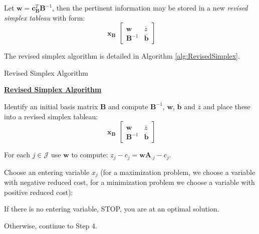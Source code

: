 Let $\mathbf{w} = \mathbf{c}_\mathbf{B}^{T}\mathbf{B}^{-1}$, then the pertinent information may be stored in a new \textit{revised simplex tableau} with form:
\begin{equation}
\begin{array}{c}
\\
\mathbf{x}_\mathbf{B}
\end{array}
\left[
\begin{array}{c|c}
\mathbf{w} & \overline{z}\\
\hline
\mathbf{B}^{-1} & \overline{\mathbf{b}}
\end{array}\right]
\end{equation}

The revised simplex algorithm is detailed in Algorithm \ref{alg:RevisedSimplex}. 
\begin{algorithm}
\caption{Revised Simplex Algorithm}
\label{alg:RevisedSimplex}
\begin{center}
\begin{minipage}[t]{\textwidth-1em}
\underline{\textbf{Revised Simplex Algorithm}}
\begin{enumerate*}
\item Identify an initial basis matrix $\mathbf{B}$ and compute $\mathbf{B}^{-1}$, $\mathbf{w}$, $\overline{\mathbf{b}}$ and $\overline{z}$ and place these into a revised simplex tableau:
\begin{displaymath}
\begin{array}{c}
\\
\mathbf{x}_\mathbf{B}
\end{array}
\left[
\begin{array}{c|c}
\mathbf{w} & \overline{z}\\
\hline
\mathbf{B}^{-1} & \overline{\mathbf{b}}
\end{array}\right]
\end{displaymath}

\item For each $j \in \mathcal{J}$ use $\mathbf{w}$ to compute: $z_j - c_j = \mathbf{w}\mathbf{A}_{\cdot j} - c_j$. 

\item Choose an entering variable $x_j$ (for a maximization problem, we choose a variable with negative reduced cost, for a minimization problem we choose a variable with positive reduced cost):
\begin{enumerate*}
\item If there is no entering variable, STOP, you are at an optimal solution.
\item Otherwise, continue to Step 4.
\end{enumerate*}


\end{enumerate*}
\end{minipage}
\end{center}
\end{algorithm}
